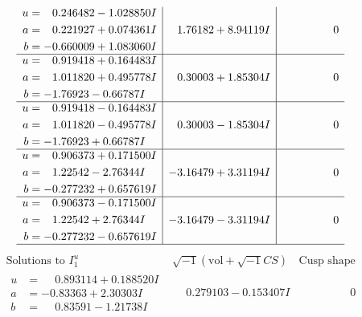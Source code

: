 \documentclass[1p]{elsarticle_modified}
\theoremstyle{definition}
\newcommand{\I}{\sqrt{-1}}
\begin{document}
$$\begin{array}{c|c|c}
\begin{aligned}
u &= \phantom{-}0.246482 - 1.028850 I \\
a &= \phantom{-}0.221927 + 0.074361 I \\
b &= -0.660009 + 1.083060 I\end{aligned}
 & \phantom{-}1.76182 + 8.94119 I & \phantom{-0.000000 } 0 \\ \hline\begin{aligned}
u &= \phantom{-}0.919418 + 0.164483 I \\
a &= \phantom{-}1.011820 + 0.495778 I \\
b &= -1.76923 - 0.66787 I\end{aligned}
 & \phantom{-}0.30003 + 1.85304 I & \phantom{-0.000000 } 0 \\ \hline\begin{aligned}
u &= \phantom{-}0.919418 - 0.164483 I \\
a &= \phantom{-}1.011820 - 0.495778 I \\
b &= -1.76923 + 0.66787 I\end{aligned}
 & \phantom{-}0.30003 - 1.85304 I & \phantom{-0.000000 } 0 \\ \hline\begin{aligned}
u &= \phantom{-}0.906373 + 0.171500 I \\
a &= \phantom{-}1.22542 - 2.76344 I \\
b &= -0.277232 + 0.657619 I\end{aligned}
 & -3.16479 + 3.31194 I & \phantom{-0.000000 } 0 \\ \hline\begin{aligned}
u &= \phantom{-}0.906373 - 0.171500 I \\
a &= \phantom{-}1.22542 + 2.76344 I \\
b &= -0.277232 - 0.657619 I\end{aligned}
 & -3.16479 - 3.31194 I & \phantom{-0.000000 } 0\\
 \hline 
 \end{array}$$\newpage$$\begin{array}{c|c|c}  
\text{Solutions to }I^u_{1}& \I (\text{vol} + \sqrt{-1}CS) & \text{Cusp shape}\\
 \hline 
\begin{aligned}
u &= \phantom{-}0.893114 + 0.188520 I \\
a &= -0.83363 + 2.30303 I \\
b &= \phantom{-}0.83591 - 1.21738 I\end{aligned}
 & \phantom{-}0.279103 - 0.153407 I & \phantom{-0.000000 } 0 \\ \hline\begin{aligned}

\end{aligned}
\end{array}$$
\end{document}
